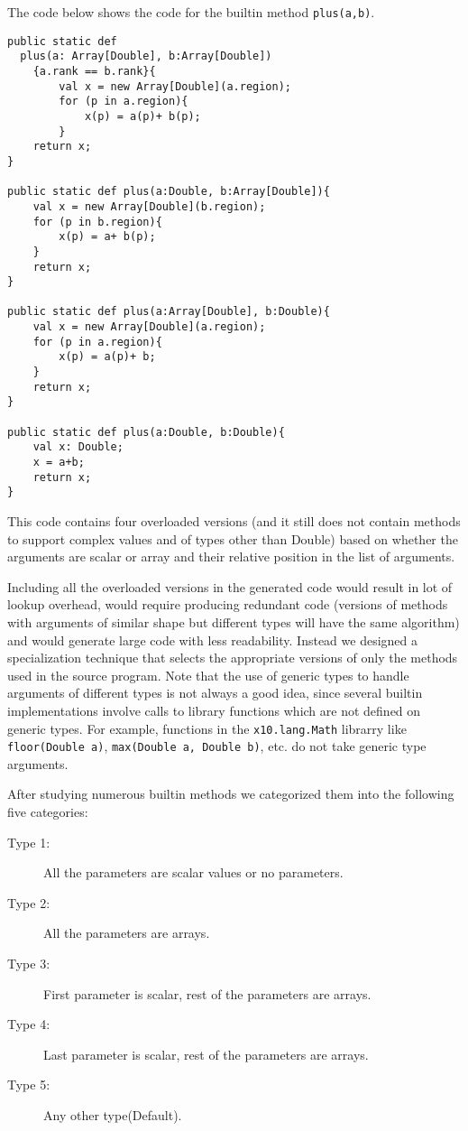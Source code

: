 The code below shows the \xten code for the \matlab builtin method
\verb|plus(a,b)|.

\noindent
\begin{lstlisting}[language=X10,numbers=none]
public static def 
  plus(a: Array[Double], b:Array[Double])
	{a.rank == b.rank}{
		val x = new Array[Double](a.region);
		for (p in a.region){
			x(p) = a(p)+ b(p);
		}
  	return x;
}
	
public static def plus(a:Double, b:Array[Double]){
	val x = new Array[Double](b.region);
	for (p in b.region){
		x(p) = a+ b(p);
	}
	return x;
}
	
public static def plus(a:Array[Double], b:Double){
	val x = new Array[Double](a.region);
	for (p in a.region){
		x(p) = a(p)+ b;
	}
	return x;
}
	
public static def plus(a:Double, b:Double){
	val x: Double;
	x = a+b;
	return x;
}
\end{lstlisting}

This \xten code contains four overloaded versions (and it still does not
contain methods to support complex values and of types other than Double) based 
on whether the arguments are scalar or array and their relative position
in the list of arguments. 

Including all the overloaded versions in the generated \xten code would result
in lot of lookup overhead, would require producing redundant code (versions
of methods with arguments of similar shape but different types will have the
same algorithm) and would generate large code with less readability. Instead we
designed a specialization technique that selects the appropriate versions of
only the methods used in the source \matlab program. Note that the use of
generic types to handle arguments of different types is not always a good idea,
since several builtin implementations involve calls to \xten library functions
which are not defined on generic types. For example, functions in the
\texttt{x10.lang.Math} librarry like \texttt{floor(Double a)},
\texttt{max(Double a, Double b)}, etc. do not take generic type arguments. 

After studying numerous builtin methods we categorized them into the
following five categories:

\begin{description}
\item[Type 1:] All the parameters are scalar values or no parameters.
\item[Type 2:] All the parameters are arrays.
\item[Type 3:] First parameter is scalar, rest of the parameters are arrays.
\item[Type 4:] Last parameter is scalar, rest of the parameters are arrays.
\item[Type 5:] Any other type(Default).
\end{description}

